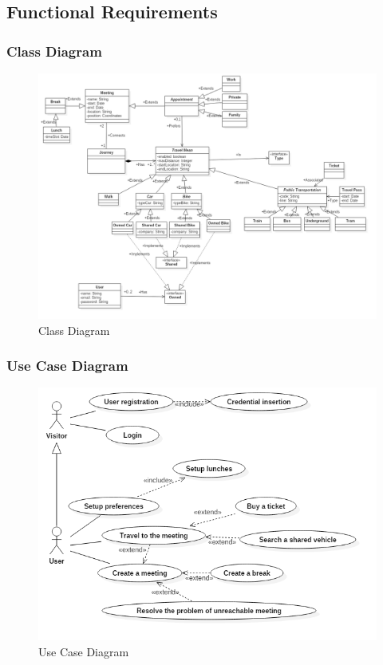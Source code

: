 \subsection{Functional Requirements}
 
\subsubsection{Class Diagram}
\begin{figure}[!htb]
\centering
\includegraphics[scale=0.4]{images/ClassDiagram}
\caption{Class Diagram}
\label{ref:classdiagram}
\end{figure}
 
\clearpage
\subsubsection{Use Case Diagram}
\begin{figure}[!h]
\centering
\includegraphics[scale=0.4]{images/UseCaseDiagram}
\caption{Use Case Diagram}
\label{ref:usecasediagram}
\end{figure}
 
